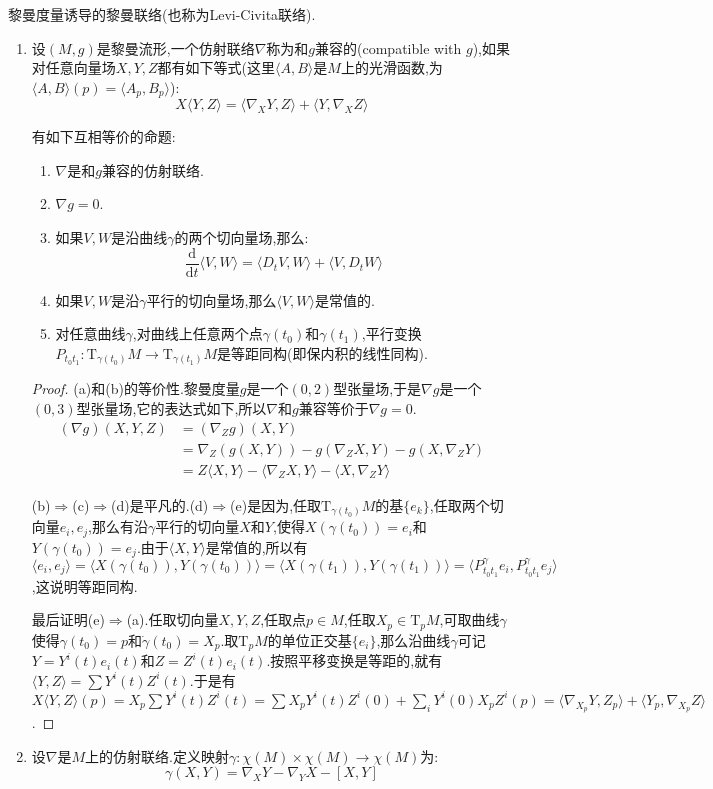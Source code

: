 黎曼度量诱导的黎曼联络(也称为Levi-Civita联络).
\begin{enumerate}
	\item 设$(M,g)$是黎曼流形,一个仿射联络$\nabla$称为和$g$兼容的(compatible with $g$),如果对任意向量场$X,Y,Z$都有如下等式(这里$\langle A,B\rangle$是$M$上的光滑函数,为$\langle A,B\rangle(p)=\langle A_p,B_p\rangle$):
	$$X\langle Y,Z\rangle=\langle\nabla_XY,Z\rangle+\langle Y,\nabla_XZ\rangle$$
	
	有如下互相等价的命题:
	\begin{enumerate}
		\item $\nabla$是和$g$兼容的仿射联络.
		\item $\nabla g=0$.
		\item 如果$V,W$是沿曲线$\gamma$的两个切向量场,那么:
		$$\frac{\mathrm{d}}{\mathrm{d}t}\langle V,W\rangle=\langle D_tV,W\rangle+\langle V,D_tW\rangle$$
		\item 如果$V,W$是沿$\gamma$平行的切向量场,那么$\langle V,W\rangle$是常值的.
		\item 对任意曲线$\gamma$,对曲线上任意两个点$\gamma(t_0)$和$\gamma(t_1)$,平行变换$P_{t_0t_1}:\mathrm{T}_{\gamma(t_0)}M\to\mathrm{T}_{\gamma(t_1)}M$是等距同构(即保内积的线性同构).
	\end{enumerate}
    \begin{proof}
    	
    	(a)和(b)的等价性.黎曼度量$g$是一个$(0,2)$型张量场,于是$\nabla g$是一个$(0,3)$型张量场,它的表达式如下,所以$\nabla$和$g$兼容等价于$\nabla g=0$.
    	\begin{align*}
    		(\nabla g)(X,Y,Z)&=(\nabla_Zg)(X,Y)\\&=\nabla_Z(g(X,Y))-g(\nabla_ZX,Y)-g(X,\nabla_ZY)\\&=Z\langle X,Y\rangle-\langle\nabla_ZX,Y\rangle-\langle X,\nabla_ZY\rangle
    	\end{align*}
    
        (b)$\Rightarrow$(c)$\Rightarrow$(d)是平凡的.(d)$\Rightarrow$(e)是因为,任取$\mathrm{T}_{\gamma(t_0)}M$的基$\{e_k\}$,任取两个切向量$e_i,e_j$,那么有沿$\gamma$平行的切向量$X$和$Y$,使得$X(\gamma(t_0))=e_i$和$Y(\gamma(t_0))=e_j$.由于$\langle X,Y\rangle$是常值的,所以有$\langle e_i,e_j\rangle=\langle X(\gamma(t_0)),Y(\gamma(t_0))\rangle=\langle X(\gamma(t_1)),Y(\gamma(t_1))\rangle=\langle P_{t_0t_1}^{\gamma}e_i,P_{t_0t_1}^{\gamma}e_j\rangle$,这说明等距同构.
        
        \qquad
        
        最后证明(e)$\Rightarrow$(a).任取切向量$X,Y,Z$,任取点$p\in M$,任取$X_p\in\mathrm{T}_pM$,可取曲线$\gamma$使得$\gamma(t_0)=p$和$\dot{\gamma}(t_0)=X_p$.取$\mathrm{T}_pM$的单位正交基$\{e_i\}$,那么沿曲线$\gamma$可记$Y=Y^i(t)e_i(t)$和$Z=Z^i(t)e_i(t)$.按照平移变换是等距的,就有$\langle Y,Z\rangle=\sum Y^i(t)Z^i(t)$.于是有$X\langle Y,Z\rangle(p)=X_p\sum Y^i(t)Z^i(t)=\sum X_pY^i(t)Z^i(0)+\sum_i Y^i(0)X_pZ^i(p)=\langle\nabla_{X_p}Y,Z_p\rangle+\langle Y_p,\nabla_{X_p}Z\rangle$.
    \end{proof}
    \item 设$\nabla$是$M$上的仿射联络.定义映射$\gamma:\chi(M)\times\chi(M)\to\chi(M)$为:
    $$\gamma(X,Y)=\nabla_XY-\nabla_YX-[X,Y]$$
    

\end{enumerate}
